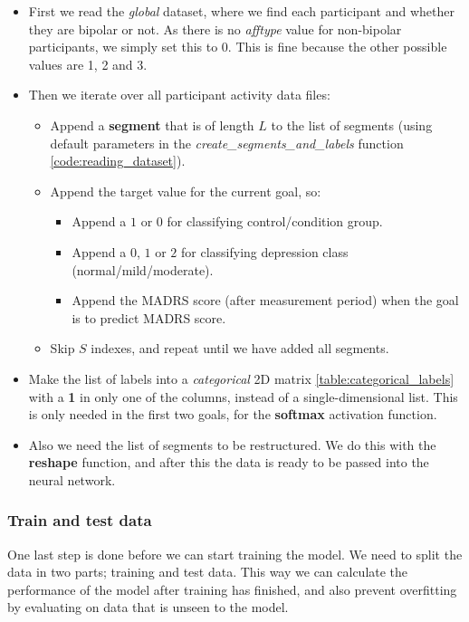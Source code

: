 \begin{itemize}
  \item First we read the \textit{global} dataset, where we find each participant and whether they are bipolar or not. As there is no \textit{afftype} value
        for non-bipolar participants, we simply set this to 0. This is fine because the other possible values are 1, 2 and 3.
  \item Then we iterate over all participant activity data files:
  \begin{itemize}
    \item Append a \textbf{segment} that is of length $L$ to the list of segments (using default parameters in the
          \textit{create\_segments\_and\_labels} function \ref{code:reading_dataset}).
    \item Append the target value for the current goal, so:
      \begin{itemize}
            \item Append a $1$ or $0$ for classifying control/condition group.
            \item Append a $0$, $1$ or $2$ for classifying depression class \\(normal/mild/moderate).
            \item Append the MADRS score (after measurement period) when the goal is to predict MADRS score.
      \end{itemize}  
    \item Skip $S$ indexes, and repeat until we have added all segments.
  \end{itemize}
  \item Make the list of labels into a \textit{categorical} 2D matrix \ref{table:categorical_labels} with a \textbf{1} in only one of the columns,
        instead of a single-dimensional list.
        This is only needed in the first two goals, for the \textbf{softmax} activation function.
  \item Also we need the list of segments to be restructured. We do this with the \textbf{reshape} function, 
        and after this the data is ready to be passed into the neural network.
\end{itemize}

\subsubsection{Train and test data}
One last step is done before we can start training the model. We need to split the data in two parts; training and test data. This way we can calculate 
the performance of the model after training has finished, and also prevent overfitting by evaluating on data that is unseen to the model. 

